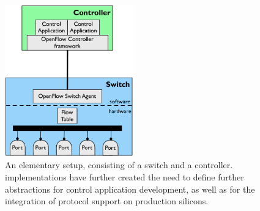 \begin{figure}
  \begin{center}
\includegraphics[width=0.5\textwidth]{Background/BackgroundFigs/openflow-schema}
\caption[An elementary \of setup]{An elementary \of setup, consisting of a
switch and a controller. \of implementations have further created the need to
define further abstractions for control application development, as well as for
the integration of protocol support on production silicons.}
\label{fig:background:openflow-schema}
\end{center}
\end{figure}
